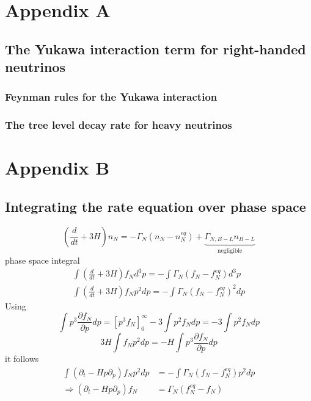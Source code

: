 \appendix
\chapter{Appendix A}
\section{The Yukawa interaction term for right-handed neutrinos}
\subsection{Feynman rules for the Yukawa interaction}
\subsection{The tree level decay rate for heavy neutrinos}
\label{ap:tree_level_decay}
\chapter{Appendix B}
\section{Integrating the rate equation over phase space}
\label{ap:phase_space}
\begin{equation*}
\left(\frac{d}{dt}+3H\right)n_N=-\Gamma_N\left(n_N-n_N^{eq}\right)+\underbrace{\Gamma_{N,B-L}n_{B-L}}_\text{negligible}
\end{equation*}
phase space integral
\begin{align*}
\int \left(\frac{d}{dt}+3H\right)f_Nd^3p=-\int\Gamma_N\left(f_N-f_N^{eq}\right)d^3p\\
\int \left(\frac{d}{dt}+3H\right)f_Np^2dp=-\int\Gamma_N\left(f_N-f_N^{eq}\right)^2dp
\end{align*}
Using
\begin{equation*}
\int p^3\frac{\partial f_N}{\partial p}dp=\left[p^3f_N\right]_0^\infty-3\int p^2f_Ndp=-3\int p^2f_Ndp
\end{equation*}
\begin{equation*}
3H\int f_Np^2dp=-H\int p^3\frac{\partial f_N}{\partial p}dp
\end{equation*}
it follows
\begin{align*}
\int \left(\partial_t-Hp\partial_p\right)f_Np^2dp&=-\int\Gamma_N\left(f_N-f_N^{eq}\right)p^2dp\\
\Rightarrow \left(\partial_t-Hp\partial_p\right)f_N&=\Gamma_N\left(f_N^{eq}-f_N\right)
\end{align*}
